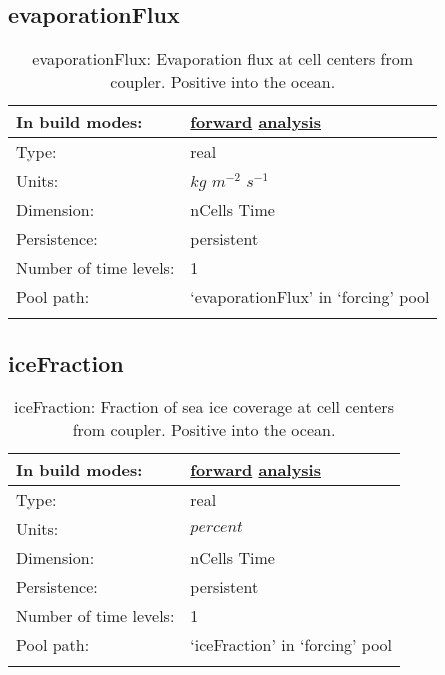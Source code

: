 \subsection[evaporationFlux]{evaporationFlux}
\label{subsec:var_sec_forcing_evaporationFlux}
\begin{center}
\begin{longtable}{| p{2.0in} | p{4.0in} |}
        \hline 
        In build modes: & \hyperref[subsec:forward_var_tab_forcing]{forward} \hyperref[subsec:analysis_var_tab_forcing]{analysis} \\
        \hline 
        Type: & real \\
        \hline 
        Units: & $kg$ $m^{-2}$ $s^{-1}$ \\
        \hline 
        Dimension: & nCells Time \\
        \hline 
        Persistence: & persistent \\
        \hline 
        Number of time levels: & 1 \\
        \hline 
            Pool path: & `evaporationFlux' in `forcing' pool \\
		 \hline 
    \caption{evaporationFlux: Evaporation flux at cell centers from coupler. Positive into the ocean.}
\end{longtable}
\end{center}
\subsection[iceFraction]{iceFraction}
\label{subsec:var_sec_forcing_iceFraction}
\begin{center}
\begin{longtable}{| p{2.0in} | p{4.0in} |}
        \hline 
        In build modes: & \hyperref[subsec:forward_var_tab_forcing]{forward} \hyperref[subsec:analysis_var_tab_forcing]{analysis} \\
        \hline 
        Type: & real \\
        \hline 
        Units: & $percent$ \\
        \hline 
        Dimension: & nCells Time \\
        \hline 
        Persistence: & persistent \\
        \hline 
        Number of time levels: & 1 \\
        \hline 
            Pool path: & `iceFraction' in `forcing' pool \\
		 \hline 
    \caption{iceFraction: Fraction of sea ice coverage at cell centers from coupler. Positive into the ocean.}
\end{longtable}
\end{center}
